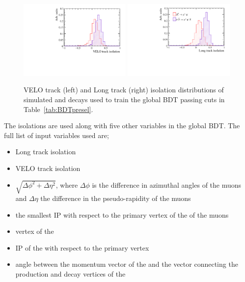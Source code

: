 \begin{figure}[htbp]
    \centering
        \includegraphics[width=0.49\textwidth]{./Figs/Selection/iso_vel_Mar.pdf}
              \includegraphics[width=0.49\textwidth]{./Figs/Selection/long_track_Mar.pdf}
           \caption{VELO track (left) and Long track (right) isolation distributions of simulated \bsmumu and \bbbarmumux decays used to train the global BDT passing cuts in Table~\ref{tab:BDTpresel}.}
    \label{fig:Isolations}
\end{figure}

The isolations are used along with five other variables in the global BDT. The full list of input variables used are;
\begin{itemize}
\item Long track isolation
\item VELO track isolation
\item $\sqrt{\Delta \phi^{2} + \Delta \eta^{2}}$, where $\Delta \phi$ is the difference in azimuthal angles of the muons and $\Delta \eta$ the difference in the pseudo-rapidity of the muons
\item the smallest IP \chisqd with respect to the primary vertex of the \bsmumu of the muons
\item vertex \chisqd of the \bs
\item IP \chisqd of the \bs with respect to the primary vertex
\item angle between the momentum vector of the \bs and the vector connecting the production and decay vertices of the \bs
\end{itemize}

